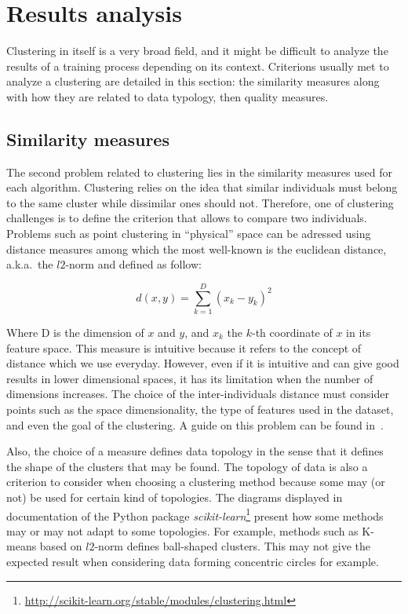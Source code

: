     \section{Results analysis}
    Clustering in itself is a very broad field, and it might be difficult to analyze the results of a training process depending on its context. Criterions usually met to analyze a clustering are detailed in this section: the similarity measures along with how they are related to data typology, then quality measures.
    
    \subsection{Similarity measures}
    The second problem related to clustering lies in the similarity measures used for each algorithm. Clustering relies on the idea that similar individuals must belong to the same cluster while dissimilar ones should not. Therefore, one of clustering challenges is to define the criterion that allows to compare two individuals. Problems such as point clustering in ``physical'' space can be adressed using distance measures among which the most well-known is the euclidean distance, a.k.a.\ the $l2$-norm and defined as follow: 
    
    \begin{equation}
    d\left(x,y\right) = \sum_{k=1}^D {\left(x_k - y_k\right)}^2
    \end{equation}

    Where D is the dimension of $x$ and $y$, and $x_k$ the $k$-th coordinate of $x$ in its feature space. This measure is intuitive because it refers to the concept of distance which we use everyday. However, even if it is intuitive and can give good results in lower dimensional spaces, it has its limitation when the number of dimensions increases. The choice of the inter-individuals distance must consider points such as the space dimensionality, the type of features used in the dataset, and even the goal of the clustering. A guide on this problem can be found in~\cite{domingos2012few}.

    Also, the choice of a measure defines data topology in the sense that it defines the shape of the clusters that may be found. The topology of data is also a criterion to consider when choosing a clustering method because some may (or not) be used for certain kind of topologies. The diagrams displayed in documentation of the Python package \textit{scikit-learn}\footnote{\url{http://scikit-learn.org/stable/modules/clustering.html}} present how some methods may or may not adapt to some topologies. For example, methods such as K-means based on $l2$-norm defines ball-shaped clusters. This may not give the expected result when considering data forming concentric circles for example.

